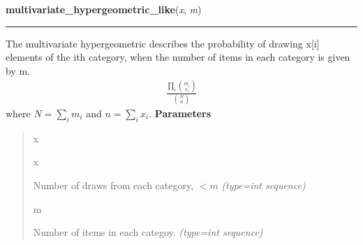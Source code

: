     \label{pymc:distributions:multivariate_hypergeometric_like}

    \vspace{0.5ex}

\hspace{.8\funcindent}\begin{boxedminipage}{\funcwidth}

    \raggedright \textbf{multivariate\_hypergeometric\_like}(\textit{x}, \textit{m})

    \vspace{-1.5ex}

    \rule{\textwidth}{1pt}
\setlength{\parskip}{2ex}

The multivariate hypergeometric describes the probability of drawing x{[}i{]}
elements of the ith category, when the number of items in each category is
given by m.
\begin{equation*}\begin{split}\frac{\prod_i \binom{m_i}{x_i}}{\binom{N}{n}}\end{split}\end{equation*}
where $N = \sum_i m_i$ and $n = \sum_i x_i$.
\setlength{\parskip}{1ex}
      \textbf{Parameters}
      \vspace{-1ex}

      \begin{quote}
        \begin{Ventry}{x}

          \item[x]


Number of draws from each category, $< m$
            {\it (type=int sequence)}

          \item[m]


Number of items in each categoy.
            {\it (type=int sequence)}

        \end{Ventry}

      \end{quote}

    \end{boxedminipage}

    \label{pymc:distributions:mv_normal_chol_like}

    \vspace{0.5ex}

